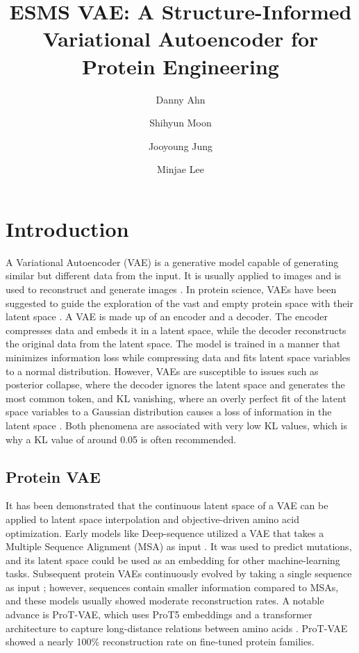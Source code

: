 \documentclass[unnumsec,webpdf,contemporary,medium]{oup-authoring-template}
\title[ESMS VAE: Structure-Informed VAE for Protein Engineering]{ESMS VAE: A Structure-Informed Variational Autoencoder for Protein Engineering}
\author[1,$\ast$]{Danny Ahn\orcidlink{0009-0006-2820-1498}}
\author[1]{Shihyun Moon\orcidlink{0000-0000-0000-0000}}
\author[1]{Jooyoung Jung\orcidlink{0000-0000-0000-0002}}
\author[1]{Minjae Lee\orcidlink{0009-0002-7484-7338}}
\begin{document}
\maketitle
\section{Introduction}\label{sec:introduction}
A Variational Autoencoder (VAE) \cite{kingma2022autoencodingvariationalbayes} is a generative model capable of generating similar but different data from the input. It is usually applied to images and is used to reconstruct and generate images \cite{greener2018protein}. In protein science, VAEs have been suggested to guide the exploration of the vast and empty protein space with their latent space \cite{greener2018protein}. A VAE is made up of an encoder and a decoder. The encoder compresses data and embeds it in a latent space, while the decoder reconstructs the original data from the latent space. The model is trained in a manner that minimizes information loss while compressing data and fits latent space variables to a normal distribution. However, VAEs are susceptible to issues such as posterior collapse, where the decoder ignores the latent space and generates the most common token, and KL vanishing, where an overly perfect fit of the latent space variables to a Gaussian distribution causes a loss of information in the latent space \cite{lucas2019understanding}. Both phenomena are associated with very low KL values, which is why a KL value of around 0.05 is often recommended.

\subsection{Protein VAE}\label{subsec:protein_vae}
It has been demonstrated that the continuous latent space of a VAE can be applied to latent space interpolation and objective-driven amino acid optimization. Early models like Deep-sequence utilized a VAE that takes a Multiple Sequence Alignment (MSA) as input \cite{riesselman2018deepsequence}. It was used to predict mutations, and its latent space could be used as an embedding for other machine-learning tasks. Subsequent protein VAEs continuously evolved by taking a single sequence as input \cite{sinai2017lc}; however, sequences contain smaller information compared to MSAs, and these models usually showed moderate reconstruction rates. A notable advance is ProT-VAE, which uses ProT5 embeddings and a transformer architecture to capture long-distance relations between amino acids \cite{elnaggar2021prottrans}. ProT-VAE showed a nearly 100\% reconstruction rate on fine-tuned protein families.
\end{document}
